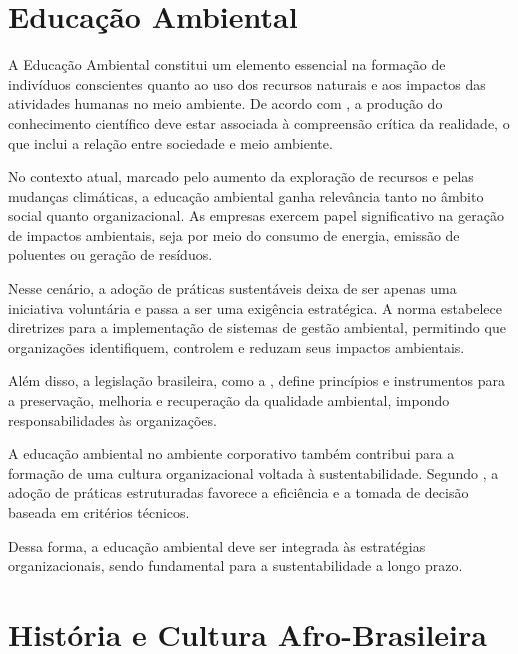 \documentclass[
    12pt
    ,oneside
    ,a4paper
    ,chapter=TITLE
    ,section=TITLE
    ,sumario=abnt-6027-2012]{abntex2}
\begin{document}
\chapter{Educação Ambiental}

A Educação Ambiental constitui um elemento essencial na formação de indivíduos conscientes quanto ao uso dos recursos naturais e aos impactos das atividades humanas no meio ambiente. De acordo com , a produção do conhecimento científico deve estar associada à compreensão crítica da realidade, o que inclui a relação entre sociedade e meio ambiente.

No contexto atual, marcado pelo aumento da exploração de recursos e pelas mudanças climáticas, a educação ambiental ganha relevância tanto no âmbito social quanto organizacional. As empresas exercem papel significativo na geração de impactos ambientais, seja por meio do consumo de energia, emissão de poluentes ou geração de resíduos.

Nesse cenário, a adoção de práticas sustentáveis deixa de ser apenas uma iniciativa voluntária e passa a ser uma exigência estratégica. A norma  estabelece diretrizes para a implementação de sistemas de gestão ambiental, permitindo que organizações identifiquem, controlem e reduzam seus impactos ambientais.

Além disso, a legislação brasileira, como a , define princípios e instrumentos para a preservação, melhoria e recuperação da qualidade ambiental, impondo responsabilidades às organizações.

A educação ambiental no ambiente corporativo também contribui para a formação de uma cultura organizacional voltada à sustentabilidade. Segundo , a adoção de práticas estruturadas favorece a eficiência e a tomada de decisão baseada em critérios técnicos.

Dessa forma, a educação ambiental deve ser integrada às estratégias organizacionais, sendo fundamental para a sustentabilidade a longo prazo.

\chapter{História e Cultura Afro-Brasileira}
\end{document}
